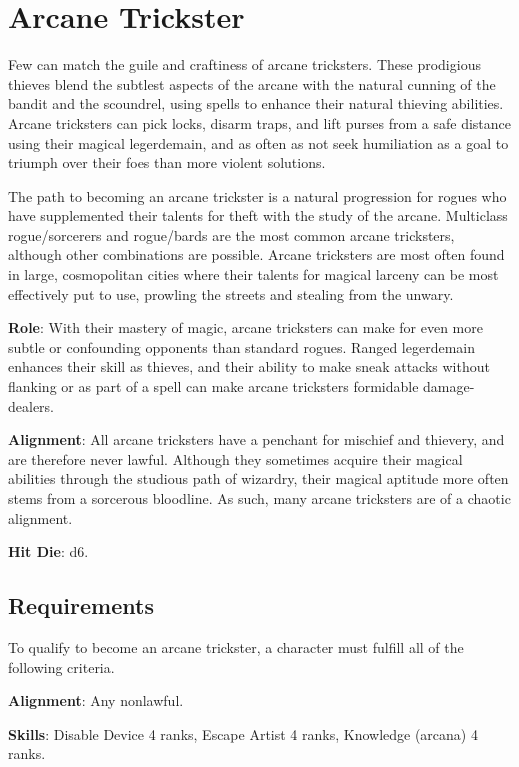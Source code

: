 \section{Arcane Trickster}

\label{f0}				
Few can match the guile and craftiness of arcane tricksters. These prodigious thieves blend the subtlest aspects of the arcane with the natural cunning of the bandit and the scoundrel, using spells to enhance their natural thieving abilities. Arcane tricksters can pick locks, disarm traps, and lift purses from a safe distance using their magical legerdemain, and as often as not seek humiliation as a goal to triumph over their foes than more violent solutions.
				
The path to becoming an arcane trickster is a natural progression for rogues who have supplemented their talents for theft with the study of the arcane. Multiclass rogue/sorcerers and rogue/bards are the most common arcane tricksters, although other combinations are possible. Arcane tricksters are most often found in large, cosmopolitan cities where their talents for magical larceny can be most effectively put to use, prowling the streets and stealing from the unwary.
				
\textbf{Role}: With their mastery of magic, arcane tricksters can make for even more subtle or confounding opponents than standard rogues. Ranged legerdemain enhances their skill as thieves, and their ability to make sneak attacks without flanking or as part of a spell can make arcane tricksters formidable damage-dealers.
				
\textbf{Alignment}: All arcane tricksters have a penchant for mischief and thievery, and are therefore never lawful. Although they sometimes acquire their magical abilities through the studious path of wizardry, their magical aptitude more often stems from a sorcerous bloodline. As such, many arcane tricksters are of a chaotic alignment.
				
\textbf{Hit Die}: d6.
				
\subsection{Requirements}

				
To qualify to become an arcane trickster, a character must fulfill all of the following criteria.
				
\textbf{Alignment}: Any nonlawful.
				
\textbf{Skills}: Disable Device 4 ranks, Escape Artist 4 ranks, Knowledge (arcana) 4 ranks.
				
